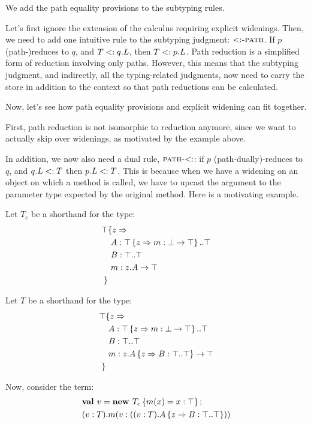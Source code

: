 \documentclass[9pt]{sigplanconf}
\begin{document}
We add the path equality provisions to the subtyping rules.

Let's first ignore the extension of the calculus requiring explicit
widenings. Then, we need to add one
intuitive rule to the subtyping judgment: $\textsc{$<:$-path}$. If
$p$ (path-)reduces to $q$, and $T <: q.L$, then $T <: p.L$. Path
reduction is a simplified form of reduction involving only
paths. However, this means that the subtyping judgment, and
indirectly, all the typing-related judgments, now need to carry the
store in addition to the context so that path reductions can be
calculated.

Now, let's see how path equality provisions and explicit widening can
fit together.

First, path reduction is not isomorphic to reduction anymore, since we
want to actually skip over widenings, as motivated by the example above.

In addition, we now also need a dual rule, $\textsc{path-$<:$}$: if
$p$ (path-dually)-reduces to $q$, and $q.L <: T$ then $p.L <:
T$. This is because when we have a widening on an object on which a
method is called, we have to upcast the argument to the parameter type
expected by the original method. Here is a motivating example.

Let $T_c$ be a shorthand for the type:
\begin{align*}
\top &\{z \Rightarrow \\
&\ A : \top \left\{z \Rightarrow m : \bot \rightarrow \top \right\}..\top\\
&\ B : \top..\top\\
&\ m : z.A \rightarrow \top\\
 \}&
\end{align*}

Let $T$ be a shorthand for the type:
\begin{align*}
\top &\{z \Rightarrow \\
&\ A : \top \left\{z \Rightarrow m : \bot \rightarrow \top \right\}..\top\\
&\ B : \top..\top\\
&\ m : {z.A} \left\{z \Rightarrow B : \top..\top \right\} \rightarrow \top\\
 \}&
\end{align*}

Now, consider the term:
\begin{align*}
&\mlnew v {T_c \ldefs{m(x)=\wid x \Top}}{
(\wid v T).m(\wid v {((\wid v T).{A \refine z {\Ldecl B \Top \Top}})})
}
\end{align*}
\end{document}
